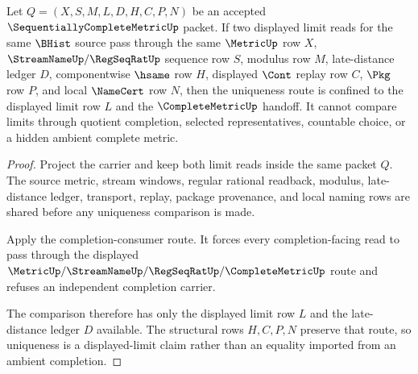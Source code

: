 \begin{theorem}
\label{thm:sequentially-complete-metric-displayed-limit-uniqueness}
Let $Q=(X,S,M,L,D,H,C,P,N)$ be an accepted $\SequentiallyCompleteMetricUp$ packet. If two displayed limit reads for the same $\BHist$ source pass through the same $\MetricUp$ row $X$, $\StreamNameUp/\RegSeqRatUp$ sequence row $S$, modulus row $M$, late-distance ledger $D$, componentwise $\hsame$ row $H$, displayed $\Cont$ replay row $C$, $\Pkg$ row $P$, and local $\NameCert$ row $N$, then the uniqueness route is confined to the displayed limit row $L$ and the $\CompleteMetricUp$ handoff. It cannot compare limits through quotient completion, selected representatives, countable choice, or a hidden ambient complete metric.
\end{theorem}
\begin{proof}
Project the carrier and keep both limit reads inside the same packet $Q$. The source metric, stream windows, regular rational readback, modulus, late-distance ledger, transport, replay, package provenance, and local naming rows are shared before any uniqueness comparison is made.

Apply the completion-consumer route. It forces every completion-facing read to pass through the displayed $\MetricUp/\StreamNameUp/\RegSeqRatUp/\CompleteMetricUp$ route and refuses an independent completion carrier.

The comparison therefore has only the displayed limit row $L$ and the late-distance ledger $D$ available. The structural rows $H,C,P,N$ preserve that route, so uniqueness is a displayed-limit claim rather than an equality imported from an ambient completion.
\end{proof}

